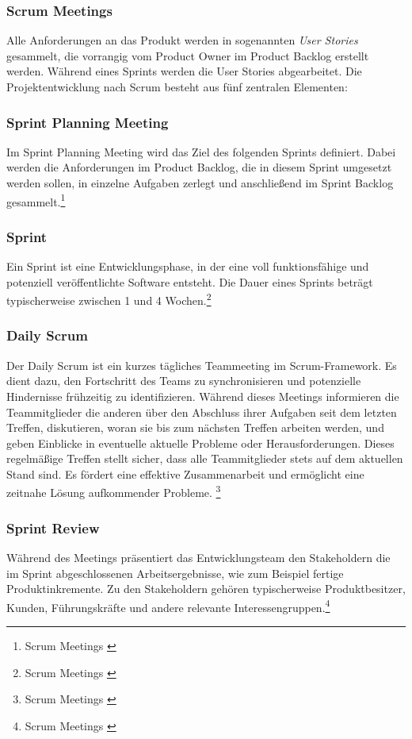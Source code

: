 \subsubsection{Scrum Meetings}
Alle Anforderungen an das Produkt werden in sogenannten \textit{User Stories} gesammelt, die vorrangig vom Product Owner
im Product Backlog erstellt werden. Während eines Sprints werden die User Stories abgearbeitet. Die Projektentwicklung
nach Scrum besteht aus fünf zentralen Elementen:

\subsubsection*{Sprint Planning Meeting}
Im Sprint Planning Meeting wird das Ziel des folgenden Sprints definiert. Dabei werden die Anforderungen im Product Backlog,
die in diesem Sprint umgesetzt werden sollen, in einzelne Aufgaben zerlegt und anschließend im Sprint Backlog
gesammelt.\footnote{Scrum Meetings \cite{Sprint planing meeting}}

\subsubsection*{Sprint}
Ein Sprint ist eine Entwicklungsphase, in der eine voll funktionsfähige und potenziell veröffentlichte Software entsteht.
Die Dauer eines Sprints beträgt typischerweise zwischen 1 und 4 Wochen.\footnote{Scrum Meetings \cite{Sprint}}

\subsubsection*{Daily Scrum}
Der Daily Scrum ist ein kurzes tägliches Teammeeting im Scrum-Framework. Es dient dazu, den Fortschritt des Teams zu
synchronisieren und potenzielle Hindernisse frühzeitig zu identifizieren. Während dieses Meetings informieren die
Teammitglieder die anderen über den Abschluss ihrer Aufgaben seit dem letzten Treffen, diskutieren, woran sie bis zum
nächsten Treffen arbeiten werden, und geben Einblicke in eventuelle aktuelle Probleme oder Herausforderungen. Dieses
regelmäßige Treffen stellt sicher, dass alle Teammitglieder stets auf dem aktuellen Stand sind. Es fördert eine effektive
Zusammenarbeit und ermöglicht eine zeitnahe Lösung aufkommender Probleme. \footnote{Scrum Meetings \cite{Daily Scrum}}

\subsubsection*{Sprint Review}
Während des Meetings präsentiert das Entwicklungsteam den Stakeholdern die im Sprint abgeschlossenen Arbeitsergebnisse,
wie zum Beispiel fertige Produktinkremente. Zu den Stakeholdern gehören typischerweise Produktbesitzer, Kunden,
Führungskräfte und andere relevante Interessengruppen.\footnote{Scrum Meetings \cite{Sprint Review}}

